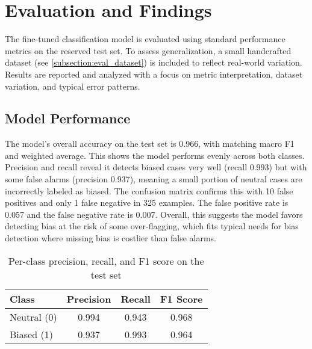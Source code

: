 \chapter{Evaluation and Findings}
    The fine-tuned classification model is evaluated using standard performance metrics on the reserved test set. To assess generalization, a small handcrafted dataset (see \autoref{subsection:eval_dataset}) is included to reflect real-world variation. Results are reported and analyzed with a focus on metric interpretation, dataset variation, and typical error patterns.

\section{Model Performance}
    The model’s overall accuracy on the test set is 0.966, with matching macro F1 and weighted average. This shows the model performs evenly across both classes. Precision and recall reveal it detects biased cases very well (recall 0.993) but with some false alarms (precision 0.937), meaning a small portion of neutral cases are incorrectly labeled as biased. The confusion matrix confirms this with 10 false positives and only 1 false negative in 325 examples. The false positive rate is 0.057 and the false negative rate is 0.007. Overall, this suggests the model favors detecting bias at the risk of some over-flagging, which fits typical needs for bias detection where missing bias is costlier than false alarms.

        \vspace{0.8em}
        \begin{table}[H]
            \centering
            \begin{tabular}{lccc}
            \toprule
            \textbf{Class} & \textbf{Precision} & \textbf{Recall} & \textbf{F1 Score} \\
            \midrule
            Neutral (0) & 0.994 & 0.943 & 0.968 \\
            Biased (1)  & 0.937 & 0.993 & 0.964 \\
            \bottomrule
            \end{tabular}
            \caption{Per-class precision, recall, and F1 score on the test set}
        \end{table}

